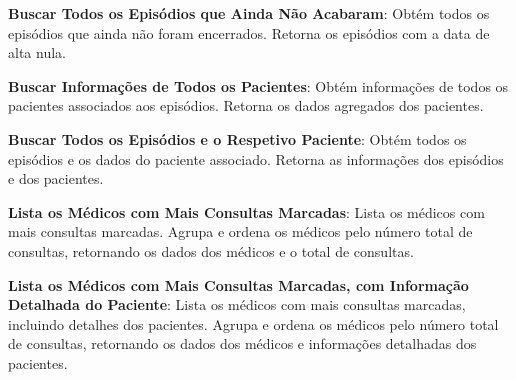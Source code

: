 \vspace{0.15cm}

\textbf{Buscar Todos os Episódios que Ainda Não Acabaram}: Obtém todos os episódios que ainda não foram encerrados. Retorna os episódios com a data de alta nula.

\vspace{0.15cm}

\textbf{Buscar Informações de Todos os Pacientes}: Obtém informações de todos os pacientes associados aos episódios. Retorna os dados agregados dos pacientes.

\vspace{0.15cm}

\textbf{Buscar Todos os Episódios e o Respetivo Paciente}: Obtém todos os episódios e os dados do paciente associado. Retorna as informações dos episódios e dos pacientes.

\vspace{0.15cm}

\textbf{Lista os Médicos com Mais Consultas Marcadas}: Lista os médicos com mais consultas marcadas. Agrupa e ordena os médicos pelo número total de consultas, retornando os dados dos médicos e o total de consultas.

\vspace{0.15cm}

\textbf{Lista os Médicos com Mais Consultas Marcadas, com Informação Detalhada do Paciente}: Lista os médicos com mais consultas marcadas, incluindo detalhes dos pacientes. Agrupa e ordena os médicos pelo número total de consultas, retornando os dados dos médicos e informações detalhadas dos pacientes.